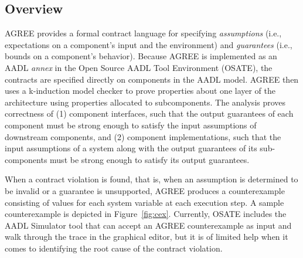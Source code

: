\subsection{Overview}

AGREE provides a formal contract language for specifying \textit{assumptions} (i.e., expectations on a component's input and the environment) and \textit{guarantees} (i.e., bounds on a component's behavior).  Because AGREE is implemented as an AADL \textit{annex} in the Open Source AADL Tool Environment (OSATE), the contracts are specified directly on components in the AADL model.  AGREE then uses a k-induction model checker to prove properties about one layer of the architecture using properties allocated to subcomponents. The analysis proves correctness of (1) component interfaces, such that the output guarantees of each component must be strong enough to satisfy the input assumptions of downstream components, and (2) component implementations, such that the input assumptions of a system along with the output guarantees of its sub-components must be strong enough to satisfy its output guarantees.

When a contract violation is found, that is, when an assumption is determined to be invalid or a guarantee is unsupported, AGREE produces a counterexample consisting of values for each system variable at each execution step.  A sample counterexample is depicted in Figure~\ref{fig:cex}.  Currently, OSATE includes the AADL Simulator tool that can accept an AGREE counterexample as input and walk through the trace in the graphical editor, but it is of limited help when it comes to identifying the root cause of the contract violation.


